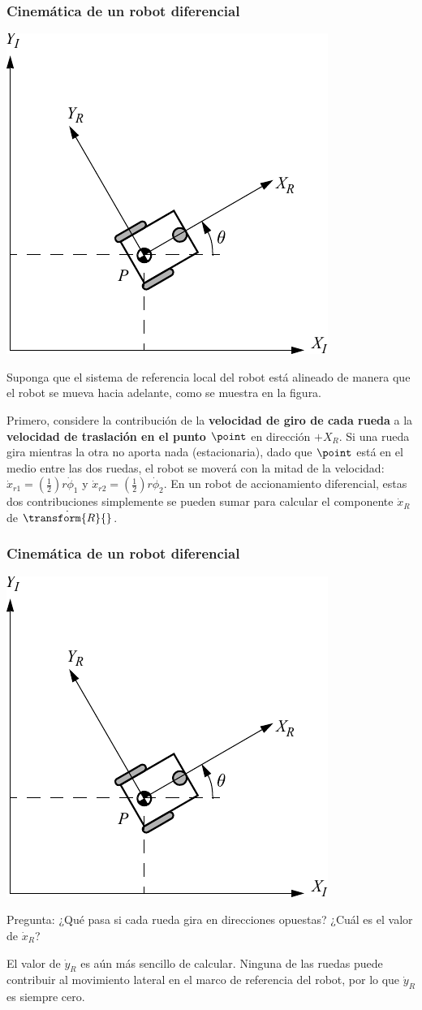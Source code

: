 \begin{frame}
    \frametitle{Cinemática de un robot diferencial}
    \footnotesize
    \begin{center}
        \includegraphics[width=0.3\columnwidth]{./images/coordinate_systems.pdf}
    \end{center}
    Suponga que el sistema de referencia local del robot está alineado de manera que el robot se mueva hacia adelante, como se muestra en la figura.
    
    Primero, considere la contribución de la {\bf velocidad de giro de cada rueda} a la {\bf velocidad de traslación en el punto $\point$} en dirección $+X_{R}$. Si una rueda gira mientras la otra no aporta nada (estacionaria), dado que $\point$ está en el medio entre las dos ruedas, el robot se moverá con la mitad de la velocidad: $\dot{x}_{r1} = \left(\frac{1}{2}\right)r\dot{\phi}_{1}$ y $ \dot{x}_{r2} = \left(\frac{1}{2}\right)r\dot{\phi}_{2}$. En un robot de accionamiento diferencial, estas dos contribuciones simplemente se pueden sumar para calcular el componente $\dot{x}_{R}$ de $\dot{\transform{R}{}}$.
\end{frame}

\begin{frame}
    \frametitle{Cinemática de un robot diferencial}
    \footnotesize
    \begin{center}
        \includegraphics[width=0.3\columnwidth]{./images/coordinate_systems.pdf}
    \end{center}
    
    Pregunta: ¿Qué pasa si cada rueda gira en direcciones opuestas? ¿Cuál es el valor de $\dot{x}_{R}$?
 


    
    El valor de $\dot{y}_{R}$ es aún más sencillo de calcular. Ninguna de las ruedas puede contribuir al movimiento lateral en el marco de referencia del robot, por lo que $\dot{y}_{R}$ es siempre cero.
\end{frame}

